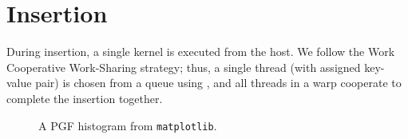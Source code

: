 \section{Insertion}

During insertion, a single kernel is executed from the host. We follow the Work Cooperative Work-Sharing strategy; thus, a single thread (with assigned key-value pair) is chosen from a queue using , and all threads in a warp cooperate to complete the insertion together.

\begin{figure}
  \begin{center}
    \resizebox{.9\linewidth}{!}{}
  \end{center}
  \caption{A PGF histogram from \texttt{matplotlib}.}
\end{figure}